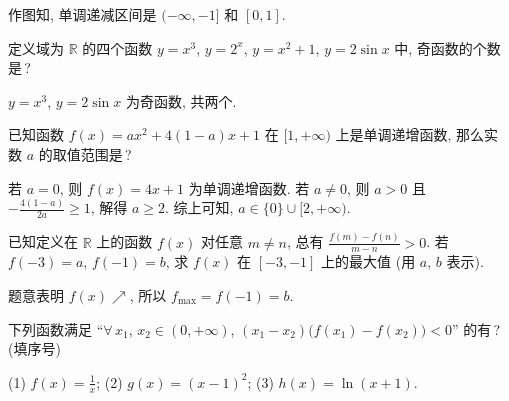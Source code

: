   \beginsolution
    作图知, 单调递减区间是 $(-\infty,-1]$ 和 $[0,1]$.
    \mymarginpar{不能答 ``单调递减区间是 $(-\infty,-1]\cup [0,1]$''.}
    \begin{center}
    \end{center}
  \endsolution
  
  \begin{exercise}
    定义域为 $\mathbb{R}$ 的四个函数 $y=x^3$, $y=2^x$, $y=x^2+1$, 
    $y=2\sin x$ 中, 奇函数的个数是\,?
  \end{exercise}

  \beginsolution
    $y=x^3$, $y=2\sin x$ 为奇函数, 共两个.
  \endsolution
  
  \begin{exercise}
    已知函数 $f(x)=ax^2 +4(1-a)x+1$ 在 $[1,+\infty )$ 上是单调递增函数,
    那么实数 $a$ 的取值范围是\,?
  \end{exercise}

  \beginsolution
    若 $a=0$, 则 $f(x)=4x+1$ 为单调递增函数. 若 $a\neq 0$, 则 $a>0$ 且 $-\frac{4(1-a)}{2a}\geqslant 1$, 解得 $a\geqslant 2$. 综上可知, $a\in \{0\}\cup [2,+\infty)$.
  \endsolution
  
  \begin{exercise}
    已知定义在 $\mathbb{R}$ 上的函数 $f(x)$ 对任意 $m\neq n$, 
    总有 $\frac{f(m)-f(n)}{m-n}>0$. 
    若 $f(-3)=a$, $f(-1)=b$, 求 $f(x)$ 在 $[-3,-1]$ 上的最大值
    (用 $a$, $b$ 表示).
  \end{exercise}

  \beginsolution
    题意表明 $f(x)\nearrow$, 所以 $f_{\max}= f(-1)=b$.
  \endsolution
    
  \begin{exercise}
    下列函数满足 ``$\forall\,x_1$, $x_2\in (0,+\infty)$, 
    $(x_1- x_2)\big(f(x_1)-f(x_2)\big)<0$'' 的有\,?(填序号)
    
    (1) $f(x)= \frac1x$; (2) $g(x)=(x-1)^2$; (3) $h(x)= \ln(x+1)$.
  \end{exercise}

